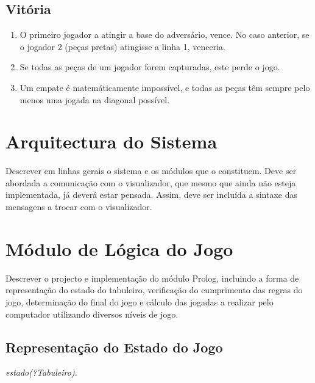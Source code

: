 \documentclass[15pt,a4paper]{article}
\begin{document}
\subsection{Vitória}
\begin{enumerate}
\item O primeiro jogador a atingir a base do adversário, vence. No caso anterior, se o jogador 2 (peças pretas) atingisse a linha 1, venceria.
\item Se todas as peças de um jogador forem capturadas, este perde o jogo.
\item Um empate é matemáticamente impossível, e todas as peças têm sempre pelo menos uma jogada na diagonal possível.
\end{enumerate}


\newpage

\section{Arquitectura do Sistema}
Descrever em linhas gerais o sistema e os módulos que o constituem. Deve ser abordada a comunicação com o visualizador, que mesmo que ainda não esteja implementada, já deverá estar pensada. Assim, deve ser incluída a sintaxe das mensagens a trocar com o visualizador.


\newpage

\section{Módulo de Lógica do Jogo}
Descrever o projecto e implementação do módulo Prolog, incluindo a forma de representação do estado do tabuleiro,  verificação do cumprimento das regras do jogo, determinação do final do jogo e cálculo das jogadas a realizar pelo computador  utilizando diversos níveis de jogo.


\subsection{Representação do Estado do Jogo} \textit{estado(?Tabuleiro).}
\end{document}
